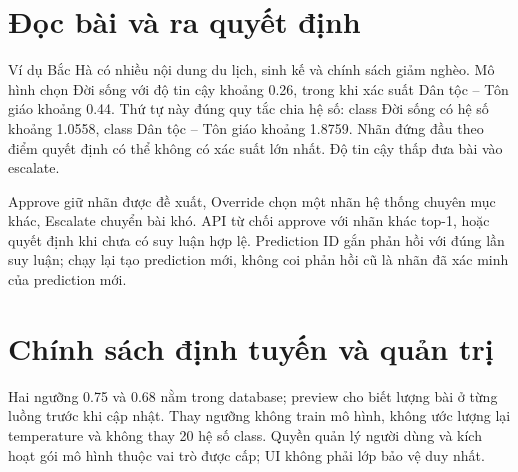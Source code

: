 \section{Đọc bài và ra quyết định}
Ví dụ Bắc Hà có nhiều nội dung du lịch, sinh kế và chính sách giảm nghèo. Mô hình chọn Đời sống với độ tin cậy khoảng 0.26, trong khi xác suất Dân tộc -- Tôn giáo khoảng 0.44. Thứ tự này đúng quy tắc chia hệ số: class Đời sống có hệ số khoảng 1.0558, class Dân tộc -- Tôn giáo khoảng 1.8759. Nhãn đứng đầu theo điểm quyết định có thể không có xác suất lớn nhất. Độ tin cậy thấp đưa bài vào escalate.

Approve giữ nhãn được đề xuất, Override chọn một nhãn hệ thống chuyên mục khác, Escalate chuyển bài khó. API từ chối approve với nhãn khác top-1, hoặc quyết định khi chưa có suy luận hợp lệ. Prediction ID gắn phản hồi với đúng lần suy luận; chạy lại tạo prediction mới, không coi phản hồi cũ là nhãn đã xác minh của prediction mới.
\ReviewDiagram
{}

\section{Chính sách định tuyến và quản trị}
Hai ngưỡng 0.75 và 0.68 nằm trong database; preview cho biết lượng bài ở từng luồng trước khi cập nhật. Thay ngưỡng không train mô hình, không ước lượng lại temperature và không thay 20 hệ số class. Quyền quản lý người dùng và kích hoạt gói mô hình thuộc vai trò được cấp; UI không phải lớp bảo vệ duy nhất.

